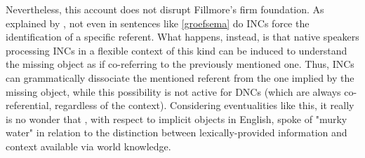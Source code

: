 Nevertheless, this account does not disrupt Fillmore's firm foundation. As explained by \textcite[527]{Eu2018}, not even in sentences like \ref{groefsema} do INCs force the identification of a specific referent. What happens, instead, is that native speakers processing INCs in a flexible context of this kind can be induced to understand the missing object as if co-referring to the previously mentioned one. Thus, INCs can grammatically dissociate the mentioned referent from the one implied by the missing object, while this possibility is not active for DNCs (which are always co-referential, regardless of the context). Considering eventualities like this, it really is no wonder that \textcite[110]{Cote1996}, with respect to implicit objects in English, spoke of "murky water" in relation to the distinction between lexically-provided information and context available via world knowledge.







